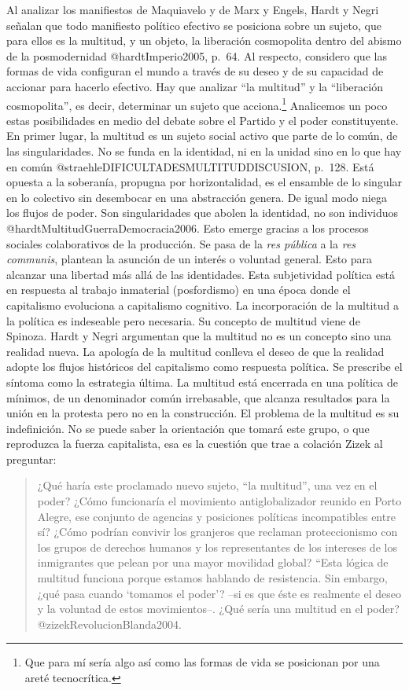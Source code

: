 \documentclass[
]{article}
\begin{document}
Al analizar los manifiestos de Maquiavelo y de Marx y Engels, Hardt y
Negri señalan que todo manifiesto político efectivo se posiciona sobre
un sujeto, que para ellos es la multitud, y un objeto, la liberación
cosmopolita dentro del abismo de la posmodernidad @hardtImperio2005,
p.~64. Al respecto, considero que las formas de vida configuran el mundo
a través de su deseo y de su capacidad de accionar para hacerlo
efectivo. Hay que analizar ``la multitud'' y la ``liberación
cosmopolita'', es decir, determinar un sujeto que acciona.\footnote{Que
  para mí sería algo así como las formas de vida se posicionan por una
  areté tecnocrítica.} Analicemos un poco estas posibilidades en medio
del debate sobre el Partido y el poder constituyente. En primer lugar,
la multitud es un sujeto social activo que parte de lo común, de las
singularidades. No se funda en la identidad, ni en la unidad sino en lo
que hay en común @straehleDIFICULTADESMULTITUDDISCUSION, p.~128. Está
opuesta a la soberanía, propugna por horizontalidad, es el ensamble de
lo singular en lo colectivo sin desembocar en una abstracción genera. De
igual modo niega los flujos de poder. Son singularidades que abolen la
identidad, no son individuos @hardtMultitudGuerraDemocracia2006. Esto
emerge gracias a los procesos sociales colaborativos de la producción.
Se pasa de la \emph{res pública} a la \emph{res communis}, plantean la
asunción de un interés o voluntad general. Esto para alcanzar una
libertad más allá de las identidades. Esta subjetividad política está en
respuesta al trabajo inmaterial (posfordismo) en una época donde el
capitalismo evoluciona a capitalismo cognitivo. La incorporación de la
multitud a la política es indeseable pero necesaria. Su concepto de
multitud viene de Spinoza. Hardt y Negri argumentan que la multitud no
es un concepto sino una realidad nueva. La apología de la multitud
conlleva el deseo de que la realidad adopte los flujos históricos del
capitalismo como respuesta política. Se prescribe el síntoma como la
estrategia última. La multitud está encerrada en una política de
mínimos, de un denominador común irrebasable, que alcanza resultados
para la unión en la protesta pero no en la construcción. El problema de
la multitud es su indefinición. No se puede saber la orientación que
tomará este grupo, o que reproduzca la fuerza capitalista, esa es la
cuestión que trae a colación Zizek al preguntar:

\begin{quote}
¿Qué haría este proclamado nuevo sujeto, ``la multitud'', una vez en el
poder? ¿Cómo funcionaría el movimiento antiglobalizador reunido en Porto
Alegre, ese conjunto de agencias y posiciones políticas incompatibles
entre sí? ¿Cómo podrían convivir los granjeros que reclaman
proteccionismo con los grupos de derechos humanos y los representantes
de los intereses de los inmigrantes que pelean por una mayor movilidad
global? ``Esta lógica de multitud funciona porque estamos hablando de
resistencia. Sin embargo, ¿qué pasa cuando `tomamos el poder'? --si es
que éste es realmente el deseo y la voluntad de estos movimientos--.
¿Qué sería una multitud en el poder? @zizekRevolucionBlanda2004.
\end{quote}
\end{document}
